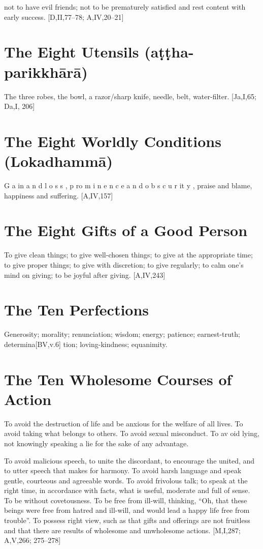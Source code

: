 not to have evil friends; not to be prematurely
satisfied and rest content with early success.
[D,II,77–78; A,IV,20–21]

\section{The Eight Utensils (aṭṭha-parikkhārā)}

The three robes, the bowl, a razor/sharp
knife, needle, belt, water-filter. [Ja,I,65; Da,I, 206]

\section{The Eight Worldly Conditions (Lokadhammā)}

G a in a n d l o s s , p ro m i n e n c e a n d o b s c u r it y ,
praise and blame, happiness and suffering.
[A,IV,157]

\section{The Eight Gifts of a Good Person}

To give clean things; to give well-chosen
things; to give at the appropriate time; to give
proper things; to give with discretion; to give
regularly; to calm one’s mind on giving; to be
joyful after giving.
[A,IV,243]

\section{The Ten Perfections}

Generosity; morality; renunciation; wisdom;
energy; patience; earnest-truth; determina[BV,v.6]
tion; loving-kindness; equanimity.

\section{The Ten Wholesome Courses of Action}

To avoid the destruction of life and be anxious for the welfare of all lives. To avoid taking what belongs to others. To avoid sexual
misconduct. To av oid lying, not knowingly
speaking a lie for the sake of any advantage.

To avoid malicious speech, to unite the
discordant, to encourage the united, and to
utter speech that makes for harmony. To
avoid harsh language and speak gentle, courteous and agreeable words. To avoid frivolous
talk; to speak at the right time, in accordance
with facts, what is useful, moderate and full
of sense. To be without covetousness. To be
free from ill-will, thinking, “Oh, that these
beings were free from hatred and ill-will, and
would lead a happy life free from trouble”. To
possess right view, such as that gifts and
offerings are not fruitless and that there are
results of wholesome and unwholesome
actions.
[M,I,287; A,V,266; 275–278]

